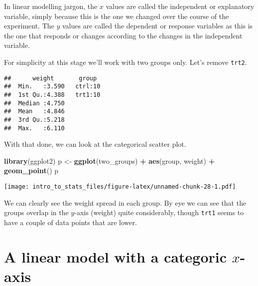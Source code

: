 \documentclass[]{book}
\newenvironment{Shaded}{\begin{snugshade}}{\end{snugshade}}
\newcommand{\KeywordTok}[1]{\textcolor[rgb]{0.13,0.29,0.53}{\textbf{#1}}}
\newcommand{\NormalTok}[1]{#1}
\newcommand{\OperatorTok}[1]{\textcolor[rgb]{0.81,0.36,0.00}{\textbf{#1}}}
\newcommand{\StringTok}[1]{\textcolor[rgb]{0.31,0.60,0.02}{#1}}
\begin{document}
In linear modelling jargon, the \(x\) values are called the independent or explanatory variable, simply because this is the one we changed over the course of the experiment. The \(y\) values are called the dependent or response variables as this is the one that responds or changes according to the changes in the independent variable.

For simplicity at this stage we'll work with two groups only. Let's remove \texttt{trt2}.

\begin{Shaded}
\end{Shaded}

\begin{verbatim}
##      weight       group   
##  Min.   :3.590   ctrl:10  
##  1st Qu.:4.388   trt1:10  
##  Median :4.750            
##  Mean   :4.846            
##  3rd Qu.:5.218            
##  Max.   :6.110
\end{verbatim}

With that done, we can look at the categorical scatter plot.

\begin{Shaded}
\begin{Highlighting}[]
\KeywordTok{library}\NormalTok{(ggplot2)}
\NormalTok{p <-}\StringTok{ }\KeywordTok{ggplot}\NormalTok{(two_groups) }\OperatorTok{+}\StringTok{ }
\StringTok{  }\KeywordTok{aes}\NormalTok{(group, weight) }\OperatorTok{+}\StringTok{ }
\StringTok{  }\KeywordTok{geom_point}\NormalTok{()}
\NormalTok{p}
\end{Highlighting}
\end{Shaded}

\texttt{[image: intro\_to\_stats\_files/figure-latex/unnamed-chunk-28-1.pdf]}

We can clearly see the weight spread in each group. By eye we can see that the groups overlap in the \(y\)-axis (weight) quite considerably, though \texttt{trt1} seems to have a couple of data points that are lower.

\hypertarget{a-linear-model-with-a-categoric-x-axis}{%
\section{\texorpdfstring{A linear model with a categoric \(x\)-axis}{A linear model with a categoric x-axis}}\label{a-linear-model-with-a-categoric-x-axis}}
\end{document}
